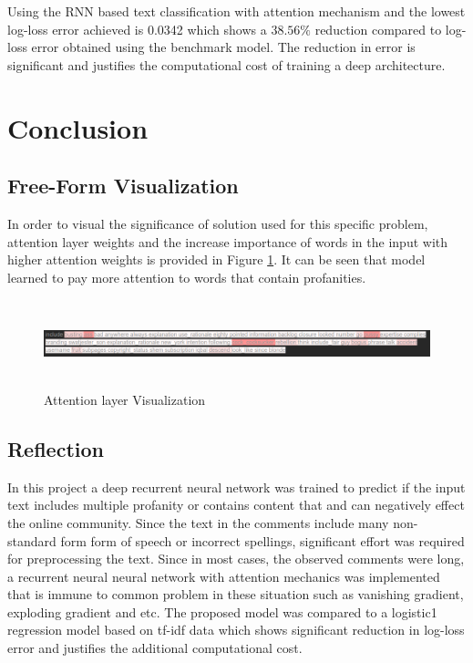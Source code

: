 \documentclass{article}
\begin{document}
    Using the RNN based text classification with attention mechanism and the lowest log-loss error achieved is 0.0342 which shows a $38.56\%$ reduction compared to log-loss error obtained using the benchmark model. The reduction in error is significant and justifies the computational cost of training a deep architecture.


\section{Conclusion}


    \subsection{Free-Form Visualization}

    In order to visual the significance of solution used for this specific problem, attention layer weights and the increase importance of words in the input with higher attention weights is provided in Figure \ref{fig:att_image}. It can be seen that model learned to pay more attention to words that contain profanities.

    \begin{figure}
        \centering
        \includegraphics[width=7in, height=1in]{att_image.png}
        \caption{Attention layer Visualization}
        \label{fig:att_image}
    \end{figure}



    \subsection{Reflection}

    In this project a deep recurrent neural network was trained to predict if the input text includes multiple profanity or contains content that and can negatively effect the online community. Since the text in the comments include many non-standard form form of speech or incorrect spellings, significant effort was required for preprocessing the text. Since in most cases, the observed comments were long, a recurrent neural neural network with attention mechanics was implemented that is immune to common problem in these situation such as vanishing gradient, exploding gradient and etc. The proposed model was compared to a logistic1 regression model based on tf-idf data which shows significant reduction in log-loss error and justifies the additional computational cost.
\end{document}
